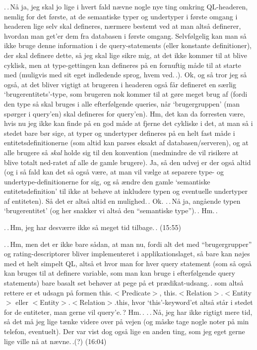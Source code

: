 \documentclass{report}
\begin{document}
.\,.\,Nå ja, jeg skal jo lige i hvert fald nævne nogle nye ting omkring QL-headeren, nemlig for det første, at de semantiske typer og undertyper i første omgang i headeren lige selv skal defineres, nærmere bestemt ved at man altså definerer, hvordan man get'er dem fra databasen i første omgang. Selvfølgelig kan man så ikke bruge denne information i de query-statements (eller konstante definitioner), der skal definere dette, så jeg skal lige sikre mig, at det ikke kommer til at blive cyklisk, men at type-gettingen kan defineres på en fornuftig måde til at starte med (muligvis med sit eget indledende sprog, hvem ved.\,.). Ok, og så tror jeg så også, at det bliver vigtigt at brugeren i headeren også får defineret en særlig `brugerentitets'-type, som brugeren nok kommer til at gøre meget brug af (fordi den type så skal bruges i alle efterfølgende queries, når `brugergruppen' (man spørger i query'en) skal defineres for query'en). Hm, det kan da forresten være, hvis nu jeg ikke kan finde på en god måde at fjerne det cykliske i det, at man så i stedet bare bør sige, at typer og undertyper defineres på en helt fast måde i entitetsdefinitionerne (som altid kan parses eksakt af databasen/serveren), og at alle brugere så \emph{skal} holde sig til den konvention (medmindre de vil risikere at blive totalt ned-ratet af alle de gamle brugere). Ja, så den udvej er der også altid (og i så fald kan det så også være, at man vil vælge at separere type- og undertype-definitionerne for sig, og så ændre den gamle `semantiske entitetsdefinition' til ikke at behøve at inkludere typen og eventuelle undertyper af entiteten). Så det er altså altid en mulighed.\,. Ok. .\,.\,Nå ja, angående typen `brugerentitet' (og her snakker vi altså den ``semantiske type'').\,. Hm.\,. %

.\,.\,Hm, jeg har desværre ikke så meget tid tilbage.\,. (15:55)

.\,.\,Hm, men det er ikke bare sådan, at man nu, fordi alt det med ``brugergrupper'' og rating-descriptorer bliver implementeret i applikationslaget, så bare kan nøjes med et helt simpelt QL, altså et hvor man for hver query statement (som så også kan bruges til at definere variable, som man kan bruge i efterfølgende query statements) bare basalt set behøver at pege på et prædikat-udsang.\,. som altså rettere er et udsagn på formen this.$<$Predicate$>$, this.$<$Relation$>$.$<$Entity$>$ eller $<$Entity$>$.$<$Relation$>$.this, hvor `this'-keyword'et altså står i stedet for de entiteter, man gerne vil query'e.\,? Hm.\,. .\,.\,Nå, jeg har ikke rigtigt mere tid, så det må jeg lige tænke videre over på vejen (og måske tage nogle noter på min telefon, eventuelt). Der var vist dog også lige en anden ting, som jeg eget gerne lige ville nå at nævne.\,.(?) (16:04)
\end{document}
